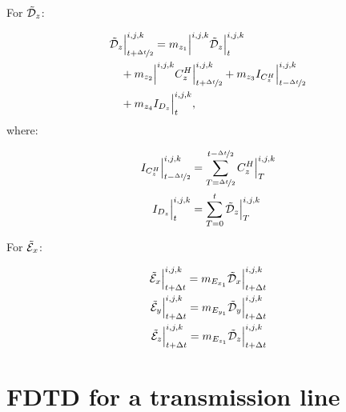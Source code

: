For $\tilde{\mathcal{D}}_z$:

\begin{align}
    &\tilde{\mathcal{D}}_z\Big|_{t+\nicefrac{\Delta t}{2}}^{i,j,k} = m_{{z_1}}\Big|^{i,j,k} \tilde{\mathcal{D}}_z\Big|_{t}^{i,j,k} 
    \nonumber \\
    & \quad + m_{{z_2}}\Big|^{i,j,k}C_z^H\Big|^{i,j,k}_{t+\nicefrac{\Delta t}{2}} + m_{{z_3}} I_{C^H_z}\Big|^{i,j,k}_{t-\nicefrac{\Delta t}{2}} 
    \nonumber \\
    & \quad + m_{{z_4}} I_{D_z}\Big|^{i,j,k}_{t},
\end{align}
where:

\begin{align}
    I_{C^H_z}\Big|^{i,j,k}_{t-\nicefrac{\Delta t}{2}} &= \sum\limits_{T=\nicefrac{\Delta t}{2}}^{t-\nicefrac{\Delta t}{2}}C_z^H\Big|^{i,j,k}_T
    \\
    I_{D_z}\Big|^{i,j,k}_{t} &= \sum\limits_{T=0}^{t} \tilde{\mathcal{D}}_z\Big|^{i,j,k}_T
\end{align}

For $\tilde{\mathcal{E}}_x$:

\begin{align}
    \tilde{\mathcal{E}}_x\Big|^{i,j,k}_{t+\Delta t} = m_{E_{x_1}} \tilde{\mathcal{D}}_x\Big|^{i,j,k}_{t+\Delta t} \\
    \tilde{\mathcal{E}}_y\Big|^{i,j,k}_{t+\Delta t} = m_{E_{y_1}} \tilde{\mathcal{D}}_y\Big|^{i,j,k}_{t+\Delta t} \\
    \tilde{\mathcal{E}}_z\Big|^{i,j,k}_{t+\Delta t} = m_{E_{z_1}} \tilde{\mathcal{D}}_z\Big|^{i,j,k}_{t+\Delta t}
\end{align}


\section{FDTD for a transmission line}


